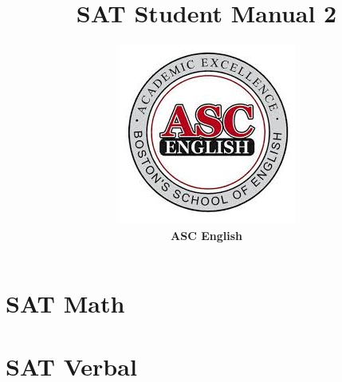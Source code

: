 \documentclass[12pt]{book}
\title{\textbf{\huge SAT Student Manual 2}}
\author{\includegraphics{logo}\\\textbf{\large ASC English}}
\date{}
\begin{document}
\maketitle


\tableofcontents


\part{SAT Math}











\part{SAT Verbal}








\end{document}
